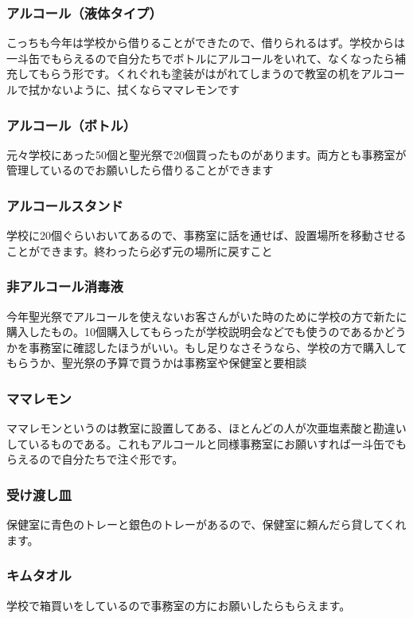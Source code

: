 \documentclass[dvipdfmx,jb5]{jreport}
\begin{document}
\subsubsection{アルコール（液体タイプ）}
こっちも今年は学校から借りることができたので、借りられるはず。学校からは一斗缶でもらえるので自分たちでボトルにアルコールをいれて、なくなったら補充してもらう形です。くれぐれも塗装がはがれてしまうので教室の机をアルコールで拭かないように、拭くならママレモンです

\subsubsection{アルコール（ボトル）}
元々学校にあった50個と聖光祭で20個買ったものがあります。両方とも事務室が管理しているのでお願いしたら借りることができます

\subsubsection{アルコールスタンド}
学校に20個ぐらいおいてあるので、事務室に話を通せば、設置場所を移動させることができます。終わったら必ず元の場所に戻すこと

\subsubsection{非アルコール消毒液}
今年聖光祭でアルコールを使えないお客さんがいた時のために学校の方で新たに購入したもの。10個購入してもらったが学校説明会などでも使うのであるかどうかを事務室に確認したほうがいい。もし足りなさそうなら、学校の方で購入してもらうか、聖光祭の予算で買うかは事務室や保健室と要相談

\subsubsection{ママレモン}
ママレモンというのは教室に設置してある、ほとんどの人が次亜塩素酸と勘違いしているものである。これもアルコールと同様事務室にお願いすれば一斗缶でもらえるので自分たちで注ぐ形です。

\subsubsection{受け渡し皿}
保健室に青色のトレーと銀色のトレーがあるので、保健室に頼んだら貸してくれます。

\subsubsection{キムタオル}
学校で箱買いをしているので事務室の方にお願いしたらもらえます。
\end{document}
